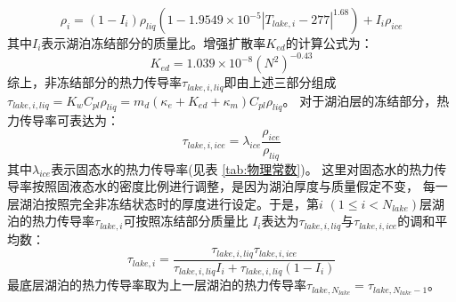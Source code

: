 \begin{equation}\label{rho_i}
\rho_{i}=\left(1-I_{i}\right) \rho_{liq}\left(1-1.9549 \times 10^{-5}\left|T_{lake, i}-277\right|^{1.68}\right)+I_{i} \rho_{ice}
\end{equation}
其中$I_i$表示湖泊冻结部分的质量比。增强扩散率$K_{ed}$的计算公式为\citep{fang1996long}：
\begin{equation}
K_{e d}=1.039 \times 10^{-8}\left(N^{2}\right)^{-0.43}
\end{equation}
综上，非冻结部分的热力传导率$\tau_{lake,i,liq}$即由上述三部分组成
$\tau_{lake,i,liq}=K_wC_{pl}\rho_{liq}=m_d\left(\kappa_e+K_{ed}+\kappa_m\right)C_{pl}\rho_{liq}$。
对于湖泊层的冻结部分，热力传导率可表达为：
\begin{equation}
\tau_{lake,i,ice}=\lambda_{ice} \frac{\rho_{ice}}{\rho_{liq}}
\end{equation}
其中$\lambda_{ice}$表示固态水的热力传导率(见表 \ref{tab:物理常数})。
这里对固态水的热力传导率按照固液态水的密度比例进行调整，是因为湖泊厚度与质量假定不变，
每一层湖泊按照完全非冻结状态时的厚度进行设定。于是，第$i$ $\left(1\le i<N_{lake}\right)$层湖泊的热力传导率$\tau_{lake,i}$可按照冻结部分质量比
$I_i$表达为$\tau_{lake,i,liq}$与$\tau_{lake,i,ice}$的调和平均数：
\begin{equation}
\tau_{lake, i}=\frac{\tau_{lake, i, liq} \tau_{lake, i, ice}}{\tau_{lake, i, liq} I_{i}+\tau_{lake, i, liq}\left(1-I_{i}\right)}
\end{equation}
最底层湖泊的热力传导率取为上一层湖泊的热力传导率$\tau_{lake,N_{lake}}=\tau_{lake,N_{lake}-1}$。 



